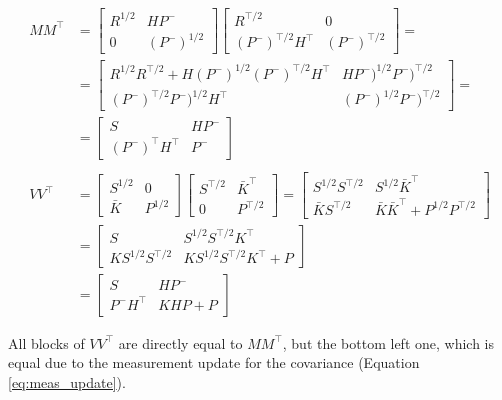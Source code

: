 \documentclass{article}
\begin{document}
\begin{equation}
\begin{split}
    MM^\top &= \begin{bmatrix} R^{1/2} & HP^- \\ 0 & (P^-)^{1/2} \end{bmatrix}\begin{bmatrix} R^{\top/2} & 0 \\ (P^-)^{\top/2}H^\top & (P^-)^{\top/2} \end{bmatrix}= \\
    &=\begin{bmatrix} R^{1/2}R^{\top/2} + H(P^-)^{1/2}(P^-)^{\top/2}H^\top & HP^-)^{1/2}P^-)^{\top/2} \\ (P^-)^{\top/2}P^-)^{1/2}H^\top & (P^-)^{1/2}P^-)^{\top/2} \end{bmatrix} = \\
    &=\begin{bmatrix}S & HP^- \\ (P^-)^\top H^\top & P^- \end{bmatrix} \\
    \\
    VV^\top & = \begin{bmatrix} S^{1/2} & 0 \\ \bar{K} & P^{1/2} \end{bmatrix}\begin{bmatrix} S^{\top/2} & \bar{K}^\top \\ 0 & P^{\top/2} \end{bmatrix} = \begin{bmatrix} S^{1/2}S^{\top/2} & S^{1/2}\bar{K}^\top \\ \bar{K}S^{\top/2} & \bar{K}\bar{K}^\top + P^{1/2}P^{\top/2} \end{bmatrix}\\
     & = \begin{bmatrix} S & S^{1/2}S^{\top/2}K^\top \\ KS^{1/2}S^{\top/2} & KS^{1/2}S^{\top/2}K^\top + P\end{bmatrix} \\
     & = \begin{bmatrix} S & HP^- \\ P^-H^\top & KHP + P\end{bmatrix}
\end{split}\label{eq:deriv_meas_update_sr}
\end{equation}

All blocks of $VV^\top$ are directly equal to $MM^\top$, but the bottom left one, which is equal due to the measurement update for the covariance (Equation \ref{eq:meas_update}).
\end{document}
